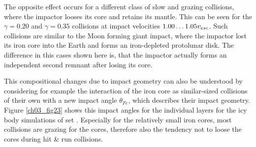 The opposite effect occurs for a different class of slow and grazing collisions, where the impactor looses its core and retains its mantle. This can be seen for the $\gamma = 0.20$ and $\gamma = 0.35$ collisions at impact velocities $1.00 \dots 1.05 v_{esc}$. Such collisions are similar to the Moon forming giant impact, where the impactor lost its iron core into the Earth and forms an iron-depleted protolunar disk. The difference in this cases shown here is, that the impactor actually forms an independent second remnant after losing its core. 

This compositional changes due to impact geometry can also be understood by considering for example the interaction of the iron core as similar-sized collisions of their own with a new impact angle $\theta_{Fe}$, which describes their impact geometry. Figure \ref{ch03_fig23} shows this impact angles for the individual layers for the icy body simulations of set \iss. Especially for the relatively small iron cores, most collisions are grazing for the cores, therefore also the tendency not to loose the cores during hit \& run collisions. 

